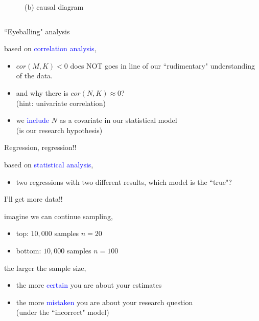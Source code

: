 \begin{frame}
\begin{columns}
\begin{column}{0.5\textwidth}
\begin{figure}
				\caption*{(b) causal diagram}
			\end{figure}
		\end{column}
	\end{columns}
\end{frame}
%
%
\begin{lhframe}[rhgraphic={\texttt{[image: pipe1\_panel.pdf]}}]
	{``Eyeballing" analysis}
	
	based on \textcolor{blue}{correlation analysis},
	\begin{itemize}
		\item $cor(M, K)<0$ does NOT goes in line of our ``rudimentary" understanding of the data.
		\item and why there is $cor(N, K) \approx 0$? \\
		{\small (hint: univariate correlation)}
		\item we \textcolor{blue}{include} $N$ as a covariate in our statistical model \\
		{\small (is our research hypothesis)}
	\end{itemize}
\end{lhframe}
%
%
\begin{lhframe}[rhgraphic={\texttt{[image: pipe1\_reg.png]}}]
	{Regression, regression!!}
	
	based on \textcolor{blue}{statistical analysis},
	\begin{itemize}
		\item two regressions with two different results, which model is the ``true"?
	\end{itemize}
\end{lhframe}
%
%
\begin{lhframe}[rhgraphic={\texttt{[image: pipe1\_samplesize.pdf]}}]
	{I'll get more data!!}
	
	imagine we can continue sampling,
	\begin{itemize}
		\item top: $10,000$ samples $n=20$
		\item bottom: $10,000$ samples $n=100$
	\end{itemize}
	
	the larger the sample size,
	\begin{itemize}
		\item the more \textcolor{blue}{certain} you are about your estimates
		\item the more \textcolor{blue}{mistaken} you are about your research question \\
		{\small (under the ``incorrect" model)}
	\end{itemize}
\end{lhframe}
